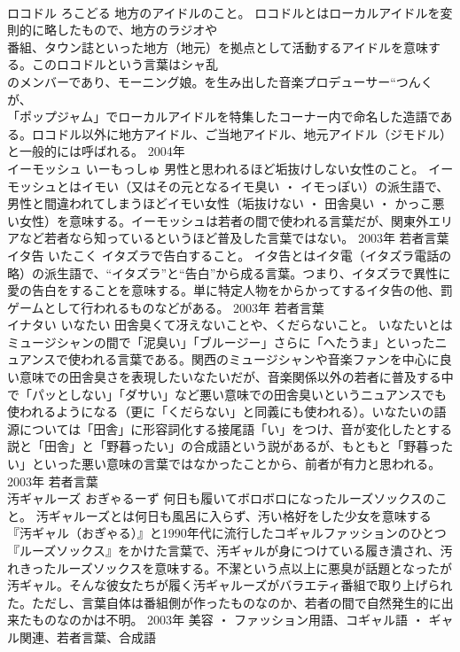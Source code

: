 \documentclass[8pt]{extreport}
\begin{document}
\begin{CJK}{UTF8}{min}
\\	ロコドル	ろこどる	地方のアイドルのこと。	ロコドルとはローカルアイドルを変則的に略したもので、地方のラジオや
\\	番組、タウン誌といった地方（地元）を拠点として活動するアイドルを意味する。このロコドルという言葉はシャ乱
\\	のメンバーであり、モーニング娘。を生み出した音楽プロデューサー“つんく
\\	が、
\\	「ポップジャム」でローカルアイドルを特集したコーナー内で命名した造語である。ロコドル以外に地方アイドル、ご当地アイドル、地元アイドル（ジモドル）と一般的には呼ばれる。	2004年	
\\	イーモッシュ	いーもっしゅ	男性と思われるほど垢抜けしない女性のこと。	イーモッシュとはイモい（又はその元となるイモ臭い ・ イモっぽい）の派生語で、男性と間違われてしまうほどイモい女性（垢抜けない ・ 田舎臭い ・ かっこ悪い女性）を意味する。イーモッシュは若者の間で使われる言葉だが、関東外エリアなど若者なら知っているというほど普及した言葉ではない。	2003年	若者言葉	
\\	イタ告	いたこく	イタズラで告白すること。	イタ告とはイタ電（イタズラ電話の略）の派生語で、“イタズラ”と“告白”から成る言葉。つまり、イタズラで異性に愛の告白をすることを意味する。単に特定人物をからかってするイタ告の他、罰ゲームとして行われるものなどがある。	2003年	若者言葉	
\\	イナタい	いなたい	田舎臭くて冴えないことや、くだらないこと。	いなたいとはミュージシャンの間で「泥臭い」「ブルージー」さらに「へたうま」といったニュアンスで使われる言葉である。関西のミュージシャンや音楽ファンを中心に良い意味での田舎臭さを表現したいなたいだが、音楽関係以外の若者に普及する中で「パッとしない」「ダサい」など悪い意味での田舎臭いというニュアンスでも使われるようになる（更に「くだらない」と同義にも使われる）。いなたいの語源については「田舎」に形容詞化する接尾語「い」をつけ、音が変化したとする説と「田舎」と「野暮ったい」の合成語という説があるが、もともと「野暮ったい」といった悪い意味の言葉ではなかったことから、前者が有力と思われる。	2003年	若者言葉	
\\	汚ギャルーズ	おぎゃるーず	何日も履いてボロボロになったルーズソックスのこと。	汚ギャルーズとは何日も風呂に入らず、汚い格好をした少女を意味する『汚ギャル（おぎゃる）』と1990年代に流行したコギャルファッションのひとつ『ルーズソックス』をかけた言葉で、汚ギャルが身につけている履き潰され、汚れきったルーズソックスを意味する。不潔という点以上に悪臭が話題となったが汚ギャル。そんな彼女たちが履く汚ギャルーズがバラエティ番組で取り上げられた。ただし、言葉自体は番組側が作ったものなのか、若者の間で自然発生的に出来たものなのかは不明。	2003年	美容 ・ ファッション用語、コギャル語 ・ ギャル関連、若者言葉、合成語	

\end{CJK}
\end{document}
